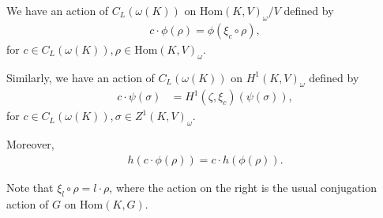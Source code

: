 	\begin{lemma}\label{lem:vcl} We have an action of $C_L(\omega(K))$ on $\mathrm{Hom}(K, V)_\omega / V$ defined by
		\begin{align} \label{vcl.hom}
			c \cdot \phi(\rho) = \phi\left(\xi_c \circ \rho \right),
		\end{align}
		for $c \in C_L(\omega(K)), \rho \in \mathrm{Hom}(K, V)_\omega$.
		
		Similarly, we have an action of $C_L(\omega(K))$ on $H^1(K, V)_\omega$ defined by
		\begin{align} \label{cl.h1}
			c \cdot \psi(\sigma)
			&= H^1(\zeta, \xi_c)\left(\psi(\sigma)\right), 
		\end{align}
		for $c \in C_L(\omega(K)), \sigma \in Z^1(K, V)_\omega$.

	Moreover,
	\begin{align}\label{eqn:caction}
		h(c\cdot\phi(\rho)) = c \cdot h(\phi(\rho)).
	\end{align}
	\end{lemma}
\begin{remark}
 Note that $\xi_l \circ \rho = l \cdot \rho$, where the action on the right is the usual conjugation action of $G$ on $\mathrm{Hom}(K, G)$.
\end{remark}
